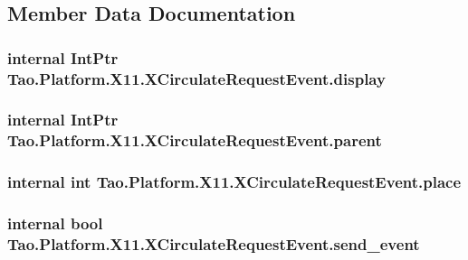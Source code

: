 \subsection{Member Data Documentation}
\hypertarget{struct_tao_1_1_platform_1_1_x11_1_1_x_circulate_request_event_a48c20b23d3d0bde64f9385b262d25c5b}{
\subsubsection[{display}]{\setlength{\rightskip}{0pt plus 5cm}internal IntPtr {\bf Tao.Platform.X11.XCirculateRequestEvent.display}}}
\label{struct_tao_1_1_platform_1_1_x11_1_1_x_circulate_request_event_a48c20b23d3d0bde64f9385b262d25c5b}
\hypertarget{struct_tao_1_1_platform_1_1_x11_1_1_x_circulate_request_event_a7f1030d81aea251728d64ceb55067881}{
\subsubsection[{parent}]{\setlength{\rightskip}{0pt plus 5cm}internal IntPtr {\bf Tao.Platform.X11.XCirculateRequestEvent.parent}}}
\label{struct_tao_1_1_platform_1_1_x11_1_1_x_circulate_request_event_a7f1030d81aea251728d64ceb55067881}
\hypertarget{struct_tao_1_1_platform_1_1_x11_1_1_x_circulate_request_event_a97a6ea51ed80a3ad82263c8cfaf26279}{
\subsubsection[{place}]{\setlength{\rightskip}{0pt plus 5cm}internal int {\bf Tao.Platform.X11.XCirculateRequestEvent.place}}}
\label{struct_tao_1_1_platform_1_1_x11_1_1_x_circulate_request_event_a97a6ea51ed80a3ad82263c8cfaf26279}
\hypertarget{struct_tao_1_1_platform_1_1_x11_1_1_x_circulate_request_event_a54f2870978b17f7f51fb0df77c9ef3e9}{
\subsubsection[{send\_\-event}]{\setlength{\rightskip}{0pt plus 5cm}internal bool {\bf Tao.Platform.X11.XCirculateRequestEvent.send\_\-event}}}
